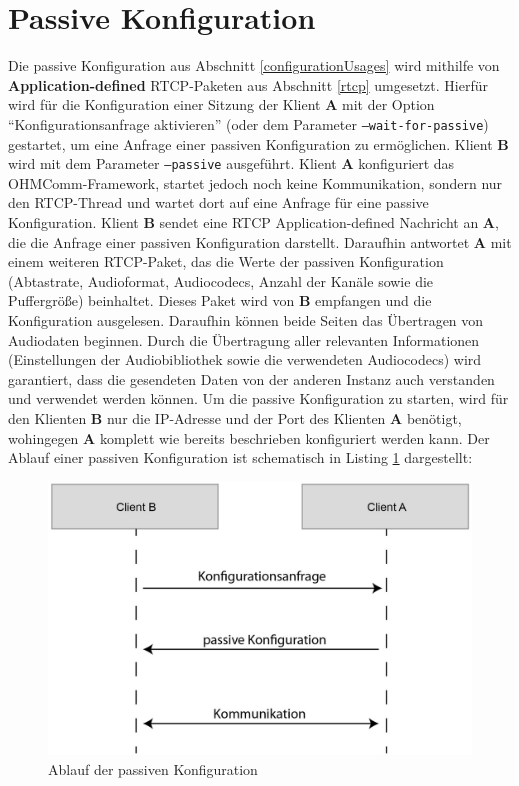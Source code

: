 \section{Passive Konfiguration}
\label{passiveConfiguration}
Die passive Konfiguration aus Abschnitt \ref{configurationUsages} wird mithilfe von \textbf{Application-defined} RTCP-Paketen aus Abschnitt \ref{rtcp} umgesetzt. Hierfür wird für die Konfiguration einer Sitzung der Klient \textbf{A} mit der Option \enquote{Konfigurationsanfrage aktivieren} (oder dem Parameter \texttt{--wait-for-passive}) gestartet, um eine Anfrage einer passiven Konfiguration zu ermöglichen. Klient \textbf{B} wird mit dem Parameter \texttt{--passive} ausgeführt. Klient \textbf{A} konfiguriert das OHMComm-Framework, startet jedoch noch keine Kommunikation, sondern nur den RTCP-Thread und wartet dort auf eine Anfrage für eine passive Konfiguration. Klient \textbf{B} sendet eine RTCP Application-defined Nachricht an \textbf{A}, die die Anfrage einer passiven Konfiguration darstellt. Daraufhin antwortet \textbf{A} mit einem weiteren RTCP-Paket, das die Werte der passiven Konfiguration (Abtastrate, Audioformat, Audiocodecs, Anzahl der Kanäle sowie die Puffergröße) beinhaltet. Dieses Paket wird von \textbf{B} empfangen und die Konfiguration ausgelesen. Daraufhin können beide Seiten das Übertragen von Audiodaten beginnen. Durch die Übertragung aller relevanten Informationen (Einstellungen der Audiobibliothek sowie die verwendeten Audiocodecs) wird garantiert, dass die gesendeten Daten von der anderen Instanz auch verstanden und verwendet werden können. Um die passive Konfiguration zu starten, wird für den Klienten \textbf{B} nur die IP-Adresse und der Port des Klienten \textbf{A} benötigt, wohingegen \textbf{A} komplett wie bereits beschrieben konfiguriert werden kann. Der Ablauf einer passiven Konfiguration ist schematisch in Listing \ref{lst:passiveConfiguration} dargestellt:
\newline
\begin{figure}[htp]
\centering
\includegraphics[width=.75\textwidth]{../img/passiveConfiguration}
\caption{Ablauf der passiven Konfiguration}
\label{lst:passiveConfiguration}
\end{figure}

